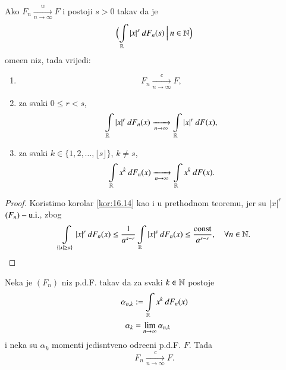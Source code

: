 \begin{kor} \label{kor:18.2}
    Ako $F_n \xrightarrow[n \to \infty]{w} F$ i postoji $s>0$ takav da je
    \begin{equation*}
        \Big( {\int\limits_{\mathbb{R}} |x|^s \: d F_n (s)} \: \Big| \: {n \in \mathbb{N}} \Big)
    \end{equation*}
    ome\dj en niz, tada vrijedi:
    \begin{enumerate}[label=(\roman*)]
        \item   \label{kor:18.2.1}
        \begin{equation*}
            F_n \xrightarrow[n \to \infty]{c} F,  
        \end{equation*}
        \item   \label{kor:18.2.2}
        za svaki $0 \leq r < s$,
        \begin{equation*}
            \int\limits_{\mathbb{R}} |x|^r \: d F_n (x) \xrightarrow[n \to \infty]{} \int\limits_{\mathbb{R}} |x|^r \: d F (x),
        \end{equation*}
        \item   \label{kor:18.2.3}
        za svaki $k \in \{ 1, 2, \ldots, \lfloor s \rfloor \}$, $k \neq s$,
        \begin{equation*}
            \int\limits_{\mathbb{R}} x^k \: d F_n (x) \xrightarrow[n \to \infty]{} \int\limits_{\mathbb{R}} x^k \: d F (x).
        \end{equation*}
    \end{enumerate}
\end{kor}

\begin{proof}
    Koristimo korolar \ref{kor:16.14} kao i u prethodnom teoremu, jer su $|x|^r$ $(F_n)-\mathrm{u.i.}$, zbog
    \begin{equation*}
        \int\limits_{\{ |x| \geq a \}} |x|^r \: d F_n (x) \leq \frac{1}{a^{s-r}} \int\limits_{\mathbb{R}} |x|^s \: d F_n (x) \leq \frac{\mathrm{const}}{a^{s-r}}, \quad \forall n \in \mathbb{N}.
    \end{equation*}
\end{proof}

\begin{tm}  \label{tm:18.3}
    Neka je $(F_n)$ niz p.d.F. takav da za svaki $k \in \mathbb{N}$ postoje
    \begin{equation*}
        \begin{aligned}
            \alpha_{n, k} &:= \int\limits_{\mathbb{R}} x^k \: d F_n (x)\\
            \alpha_k &= \lim\limits_{n \to \infty} \alpha_{n, k}  
        \end{aligned}
    \end{equation*}
    i neka su $\alpha_k$ momenti jedisntveno odre\dj eni p.d.F. $F$.
    Tada
    \begin{equation*}
        F_n \xrightarrow[n \to \infty]{c} F.
    \end{equation*}
\end{tm}

